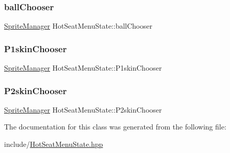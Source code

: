 \subsubsection{\texorpdfstring{ballChooser}{ballChooser}}
{\footnotesize\ttfamily \mbox{\hyperlink{class_sprite_manager}{Sprite\+Manager}} Hot\+Seat\+Menu\+State\+::ball\+Chooser}

\mbox{\label{class_hot_seat_menu_state_afe57c9d8f34baf40c000723a7593db48}} 
\subsubsection{\texorpdfstring{P1skinChooser}{P1skinChooser}}
{\footnotesize\ttfamily \mbox{\hyperlink{class_sprite_manager}{Sprite\+Manager}} Hot\+Seat\+Menu\+State\+::\+P1skin\+Chooser}

\mbox{\label{class_hot_seat_menu_state_a9ffea759e40ba0bc41c2a3afd72b783e}} 
\subsubsection{\texorpdfstring{P2skinChooser}{P2skinChooser}}
{\footnotesize\ttfamily \mbox{\hyperlink{class_sprite_manager}{Sprite\+Manager}} Hot\+Seat\+Menu\+State\+::\+P2skin\+Chooser}



The documentation for this class was generated from the following file\+:\begin{DoxyCompactItemize}
\item 
include/\mbox{\hyperlink{_hot_seat_menu_state_8hpp}{Hot\+Seat\+Menu\+State.\+hpp}}\end{DoxyCompactItemize}
